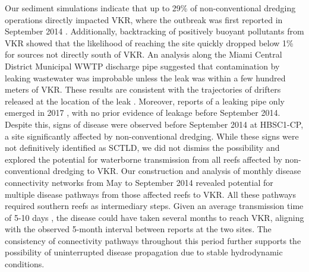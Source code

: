 \documentclass[preprint,12pt,authoryear]{elsarticle}
\begin{document}
Our sediment simulations indicate that up to 29\% of non-conventional dredging operations directly impacted VKR, where the outbreak was first reported in September 2014 \citep{precht2016unprecedented}. Additionally, backtracking of positively buoyant pollutants from VKR showed that the likelihood of reaching the site quickly dropped below 1\% for sources not directly south of VKR. An analysis along the Miami Central District Municipal WWTP discharge pipe suggested that contamination by leaking wastewater was improbable unless the leak was within a few hundred meters of VKR. These results are consistent with the trajectories of drifters released at the location of the leak \citep{staletovich2017drifter}. Moreover, reports of a leaking pipe only emerged in 2017 \citep{staletovich2017}, with no prior evidence of leakage before September 2014. Despite this, signs of disease were observed before September 2014 at HBSC1-CP, a site significantly affected by non-conventional dredging. While these signs were not definitively identified as SCTLD, we did not dismiss the possibility and explored the potential for waterborne transmission from all reefs affected by non-conventional dredging to VKR. Our construction and analysis of monthly disease connectivity networks from May to September 2014 revealed potential for multiple disease pathways from those affected reefs to VKR. All these pathways required southern reefs as intermediary steps. Given an average transmission time of 5-10 days \citep{dobbelaere2020coupled}, the disease could have taken several months to reach VKR, aligning with the observed 5-month interval between reports at the two sites. The consistency of connectivity pathways throughout this period further supports the possibility of uninterrupted disease propagation due to stable hydrodynamic conditions.
\end{document}

